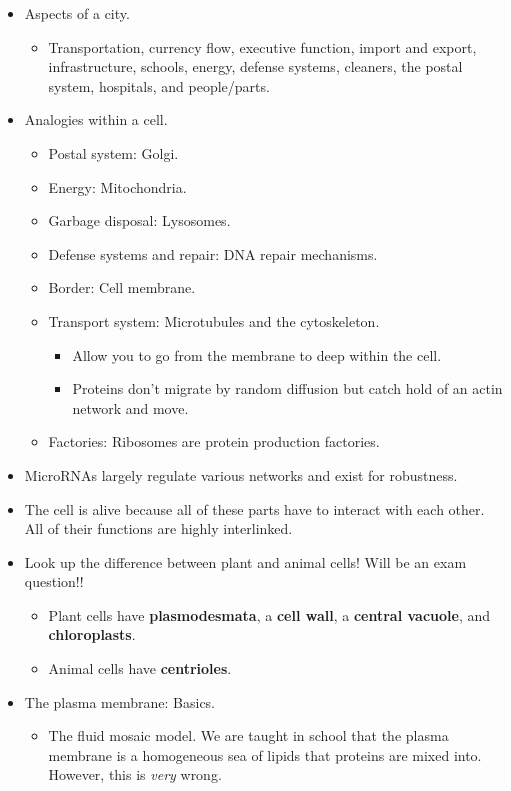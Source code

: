 \documentclass[../notes.tex]{subfiles}
\begin{document}
\begin{itemize}
    \item Aspects of a city.
    \begin{itemize}
        \item Transportation, currency flow, executive function, import and export, infrastructure, schools, energy, defense systems, cleaners, the postal system, hospitals, and people/parts.
    \end{itemize}
    \item Analogies within a cell.
    \begin{itemize}
        \item Postal system: Golgi.
        \item Energy: Mitochondria.
        \item Garbage disposal: Lysosomes.
        \item Defense systems and repair: DNA repair mechanisms.
        \item Border: Cell membrane.
        \item Transport system: Microtubules and the cytoskeleton.
        \begin{itemize}
            \item Allow you to go from the membrane to deep within the cell.
            \item Proteins don't migrate by random diffusion but catch hold of an actin network and move.
        \end{itemize}
        \item Factories: Ribosomes are protein production factories.
    \end{itemize}
    \item MicroRNAs largely regulate various networks and exist for robustness.
    \item The cell is alive because all of these parts have to interact with each other. All of their functions are highly interlinked.
    \item Look up the difference between plant and animal cells! Will be an exam question!!
    \begin{itemize}
        \item Plant cells have \textbf{plasmodesmata}, a \textbf{cell wall}, a \textbf{central vacuole}, and \textbf{chloroplasts}.
        \item Animal cells have \textbf{centrioles}.
    \end{itemize}
    \item The plasma membrane: Basics.
    \begin{itemize}
        \item The fluid mosaic model. We are taught in school that the plasma membrane is a homogeneous sea of lipids that proteins are mixed into. However, this is \emph{very} wrong.

\end{itemize}
\end{itemize}
\end{document}
